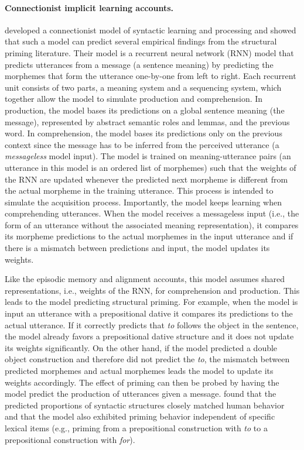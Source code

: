 \paragraph{Connectionist implicit learning accounts.} \textcite{Chang2006} developed a connectionist model of syntactic learning and processing and showed
that such a model can predict several empirical findings from the structural priming literature. Their model is a recurrent neural network (RNN)
model \cite{Elman1990} that predicts utterances from a message (a sentence meaning) by predicting the morphemes that form the utterance one-by-one from left to right.
Each recurrent unit consists of two parts, a meaning system and a sequencing system, 
which together allow the model to simulate production and comprehension. In production, the model bases
its predictions on a global sentence meaning (the message), represented by abstract semantic roles and lemmas, and the previous word. In comprehension, the model 
bases its predictions only on the previous context since the message has to be inferred from the perceived utterance (a \textit{messageless} model input). 
The model is trained on meaning-utterance pairs (an utterance in this model is an ordered list of morphemes) such that the weights of the RNN are updated 
whenever the predicted next morpheme is different from the actual morpheme in the training utterance. This process is intended to simulate the acquisition process.
Importantly, the model keeps learning when comprehending utterances. When the model receives a messageless input (i.e., the form of an utterance without the associated meaning representation), it compares its morpheme predictions
to the actual morphemes in the input utterance and if there is a mismatch between predictions and input, the model updates its weights.

Like the episodic memory and alignment accounts, this model assumes shared representations, i.e., weights of the RNN, for comprehension and production.
This leads to the model predicting structural priming. For example, when the model is input an utterance with a prepositional dative it compares its predictions
to the actual utterance. If it correctly predicts that \textit{to} follows the object in the sentence, the model already favors a prepositional dative structure and it does
not update its weights significantly. On the other hand, if the model predicted a double object construction and therefore did not predict the \textit{to}, the mismatch
between predicted morphemes and actual morphemes leads the model to update its weights accordingly. The effect of priming can then be probed by having the model predict
the production of utterances given a message. \textcite{Chang2006} found that the predicted proportions of syntactic structures closely matched human behavior and that the model
also exhibited priming behavior independent of specific lexical items (e.g., priming from a prepositional construction with \textit{to} to a prepositional construction with \textit{for}).

